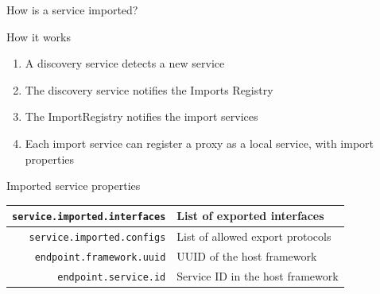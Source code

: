 \begin{frame}{How is a service imported?}
\begin{block}{How it works}
\begin{enumerate}
\item A discovery service detects a new service
\item The discovery service notifies the Imports Registry
\item The ImportRegistry notifies the import services
\item Each import service can register a proxy as a local service, with import properties
\end{enumerate}
\end{block}

\begin{block}{Imported service properties}
\begin{tabular}{rl}
\texttt{\small service.imported.interfaces} & List of exported interfaces \\
\hline
\texttt{\small service.imported.configs} & List of allowed export protocols \\
\hline
\texttt{\small endpoint.framework.uuid} & UUID of the host framework \\
\hline
\texttt{\small endpoint.service.id} & Service ID in the host framework \\
\end{tabular}
\end{block}
\end{frame}


